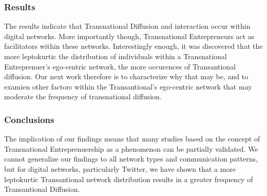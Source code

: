 \subsubsection{Results}
The results indicate that Transnational Diffusion and interaction
occur within digital networks. More importantly though, Transnational
Entrepreneurs act as facilitators within these networks. Interestingly
enough, it was discovered that the more leptokurtic the distribution
of individuals within a Transnational Entreprenuer's ego-centric
network, the more occurences of Transantional diffusion. Our next work
therefore is to characterize why that may be, and to examien other
factors within the Transantional's ego-centric network that may
moderate the frequency of transnational diffusion.

\subsubsection{Conclusions}
The implication of our findings means that many studies based on the
concept of Transnational Entreprenuership as a phenomenon can be
partially validated. We cannot generalize our findings to all network
types and communication patterns, but for digital networks,
particularly Twitter, we have shown that a more leptokurtic
Transantional network distribution results in a greater frequency of
Transantional Diffusion.
